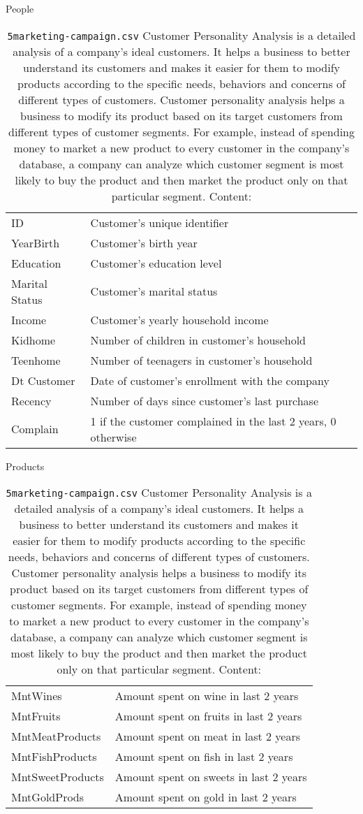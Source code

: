 \documentclass[12pt]{article}
\theoremstyle{remark}
\begin{document}
\begin{table}
	\caption{ \texttt{5marketing-campaign.csv}
	Customer Personality Analysis is a detailed analysis of a company’s ideal customers. It helps a business to better understand its customers and makes it easier for them to modify products according to the specific needs, behaviors and concerns of different types of customers.
Customer personality analysis helps a business to modify its product based on its target customers from different types of customer segments. For example, instead of spending money to market a new product to every customer in the company’s database, a company can analyze which customer segment is most likely to buy the product and then market the product only on that particular segment. Content: } 
People\\
	\begin{tabular}{l|l}\hline

ID & Customer's unique identifier \\
YearBirth & Customer's birth year \\
Education & Customer's education level \\
Marital Status & Customer's marital status \\
Income & Customer's yearly household income \\
Kidhome & Number of children in customer's household \\
Teenhome & Number of teenagers in customer's household \\
Dt Customer & Date of customer's enrollment with the company\\
Recency & Number of days since customer's last purchase \\
Complain & 1 if the customer complained in the last 2 years, 0 otherwise
	\end{tabular}
Products \\
	\begin{tabular}{l|l}\hline

MntWines & Amount spent on wine in last 2 years \\
MntFruits & Amount spent on fruits in last 2 years \\
MntMeatProducts & Amount spent on meat in last 2 years \\
MntFishProducts & Amount spent on fish in last 2 years \\
MntSweetProducts & Amount spent on sweets in last 2 years \\
MntGoldProds & Amount spent on gold in last 2 years 
	\end{tabular}
	

\end{table}
\end{document}
